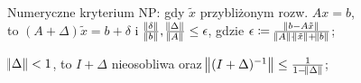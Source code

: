 
\entry
Numeryczne kryterium NP: gdy $\tilde{x}$ przybliżonym rozw. $Ax=b$,\\ to $(A+\Delta)\tilde{x}=b+\delta$ i $\frac{\norm{\delta}}{\norm{b}}, \frac{\norm{\Delta}}{\norm{A}} \leq \epsilon$, gdzie $\epsilon \coloneqq \frac{\norm{b-A\tilde{x}}}{\norm{A} \cdot \norm{\tilde{x}} + \norm{b} }$;


\entry
$\norm{\Delta} < 1$, to $I + \Delta$ nieosobliwa oraz $\norm{(I + \Delta)^{-1}} \leq \frac{1}{1 - \norm{\Delta}}$;
